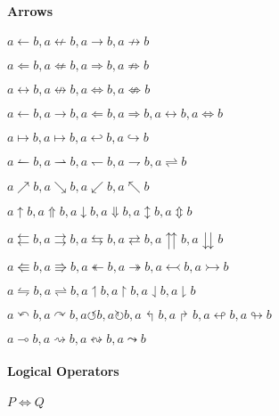 \paragraph{Arrows}
{\LARGE
    $ a \leftarrow b,   %
    a \nleftarrow b, a \rightarrow b,   %
    a \nrightarrow b $
    
    $ a \Leftarrow b, a \nLeftarrow b, a \Rightarrow b, a \nRightarrow b $

    $ a \leftrightarrow b, a \nleftrightarrow b, a \Leftrightarrow b, a \nLeftrightarrow b $

    $ a \longleftarrow b, a \longrightarrow b, a \Longleftarrow b, a \Longrightarrow b, a \longleftrightarrow b, a \Longleftrightarrow b $

    $ a \mapsto b, a \longmapsto b, a \hookleftarrow b, a \hookrightarrow b $

    $ a \leftharpoonup b, a \rightharpoonup b, a \leftharpoondown b, a \rightharpoondown b, a \rightleftharpoons b $

    $ a \nearrow b, a \searrow b, a \swarrow b, a \nwarrow b $

    $ a \uparrow b, a \Uparrow b, a \downarrow b, a \Downarrow b, a \updownarrow b, a \Updownarrow b $
}

\vspace{2em}

{\LARGE
    $ a \leftleftarrows b, a \rightrightarrows b, a \leftrightarrows b, a \rightleftarrows b, a \upuparrows b, a \downdownarrows b $

    $ a \Lleftarrow b, a \Rrightarrow b, a \twoheadleftarrow b, a \twoheadrightarrow b, 
    a \leftarrowtail b, a \rightarrowtail b $

    $ a \leftrightharpoons b, a \rightleftharpoons b,   %
    a \upharpoonleft b, a \upharpoonright b,    %
    a \downharpoonleft b, a \downharpoonright b $

    $ a \curvearrowleft b, a \curvearrowright b, a \circlearrowleft b, a \circlearrowright b, 
    a \Lsh b, a \Rsh b, a \looparrowleft b, a \looparrowright b $

    $ a \multimap b, a \rightsquigarrow b, a \leftrightsquigarrow b, a \leadsto b $
}

\paragraph{Logical Operators}
$ P \iff Q $

